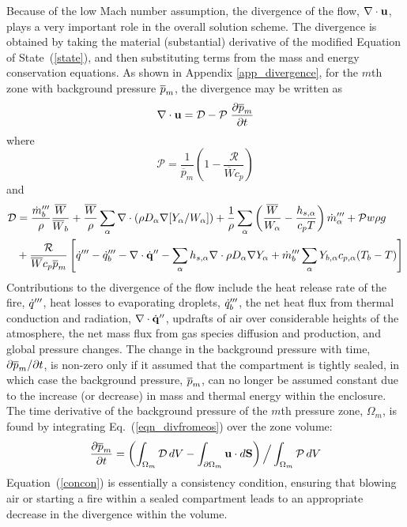 \documentclass[11pt]{book}
\begin{document}
Because of the low Mach number assumption, the divergence of the flow, $\nabla \cdot {\bf u}$, plays a very important role in the overall solution scheme. The divergence is obtained by taking the material (substantial) derivative
of the modified Equation of State~(\ref{state}), and then substituting terms from the mass
and energy conservation equations. As shown in Appendix \ref{app_divergence}, for the $m$th zone with background pressure $\overline{p}_m$, the divergence may be written as
\begin{equation}
\label{eqn_divfromeos}
\nabla \cdot {\bf u} = {\cal D} - {\cal P}\; \frac{\partial \overline{p}_m}{\partial t}
\end{equation}
where
\begin{equation}
\label{eqn_fdsP1}
\mathcal{P} = \frac{1}{\overline{p}_m}\left( 1 - \frac{\mathcal{R}}{\overline{W} c_p}  \right)
\end{equation}
and
\begin{align}
\label{eqn_fdsD1}
\mathcal{D} &= \frac{\dot{m}_b^{\prime\prime\prime}}{\rho}\frac{\overline{W}}{\overline{W}_b} +
\frac{\overline{W}}{\rho} \sum_\alpha \nabla\cdot \left( \rho D_\alpha \nabla[Y_\alpha/W_\alpha] \right) +
\frac{1}{\rho}\sum_\alpha \left( \frac{\overline{W}}{W_\alpha} -
\frac{h_{s,\alpha}}{c_p T} \right) \dot{m}_{\alpha}^{\prime\prime\prime}  + \mathcal{P} w \rho g \nonumber  \\
&+ \frac{\mathcal{R}}{\overline{W} c_p \overline{p}_m} \left[ \dot{q}^{\prime\prime\prime} - \dot{q}_b''' -
\nabla\cdot \dot{\mathbf{q}}^{\prime\prime} - \sum_\alpha h_{s,\alpha} \nabla\cdot \rho D_\alpha \nabla Y_\alpha +
\dot{m}_{b}^{{\prime\prime\prime}} \sum_\alpha Y_{b,\alpha} c_{p,\alpha}(T_b-T)  \right]
\end{align}
Contributions to the divergence of the flow include the heat release rate of the fire, $\dot{q}'''$, heat losses to evaporating droplets,
$\dot{q}_b'''$, the net heat flux from thermal conduction and radiation, $\nabla \cdot \dot{\bf q}''$, updrafts of air over considerable heights of
the atmosphere, the net mass flux from gas species diffusion and production, and global pressure changes. The change in the background
pressure with time, $\partial \overline{p}_m/\partial t$, is non-zero only if
it assumed that the compartment is tightly sealed, in which case the background pressure, $\overline{p}_m$, can no longer be assumed constant due to
the increase (or decrease) in mass and thermal energy within the enclosure. The time derivative of the background pressure of the $m$th
pressure zone, $\Omega_m$, is found by integrating Eq.~(\ref{eqn_divfromeos}) over the zone volume:
\begin{equation}
\frac{\partial \overline{p}_m}{\partial t} = \left( \int_{\Omega_m} {\cal D} \, dV - \int_{\partial \Omega_m} {\bf u} \cdot d{\bf S} \right) \Big/ \int_{\Omega_m} {\cal P} \, dV  \label{concon}
\end{equation}
Equation~(\ref{concon}) is essentially a consistency condition, ensuring that blowing air or starting a fire within a sealed
compartment leads to an appropriate decrease in the divergence within the volume.
\end{document}
